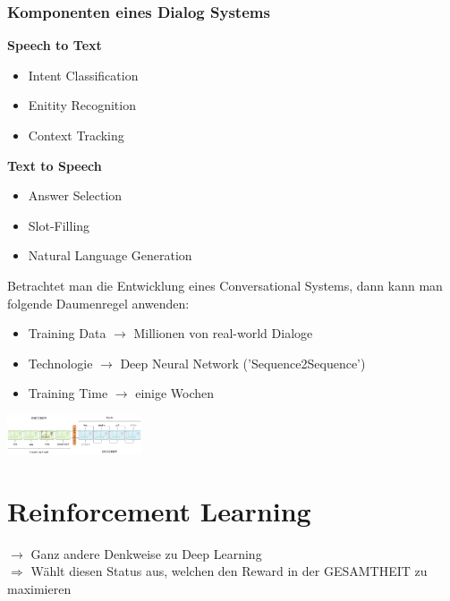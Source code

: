\documentclass{article}
\newenvironment{Figure}
	{\par\medskip\noindent\minipage{\linewidth}}
	{\endminipage\par\medskip}
\theoremstyle{merke}
\theoremstyle{definition}
\begin{document}
	    \subsection{Komponenten eines Dialog Systems}
        \textbf{Speech to Text}
        \begin{itemize}
            \item Intent Classification
            \item Enitity Recognition
            \item Context Tracking
        \end{itemize}

        \textbf{Text to Speech}
        \begin{itemize}
            \item Answer Selection
            \item Slot-Filling
            \item Natural Language Generation
        \end{itemize}

        Betrachtet man die Entwicklung eines Conversational Systems, dann kann man folgende Daumenregel anwenden:
        \begin{itemize}
            \item Training Data $\rightarrow$ Millionen von real-world Dialoge
            \item Technologie $\rightarrow$ Deep Neural Network ('Sequence2Sequence')
            \item Training Time $\rightarrow$ einige Wochen
        \end{itemize}
        \begin{Figure}
        \centering
        \includegraphics[width=150px]{img/MakingConvSystem.png}
            \label{fig:Abbildung des Vorgehens eines Conversational Systems}
        \end{Figure}


\chapter{Reinforcement Learning}
$\rightarrow$ Ganz andere Denkweise zu Deep Learning\\
$\Rightarrow$ Wählt diesen Status aus, welchen den Reward in der GESAMTHEIT zu maximieren 
\end{document}
